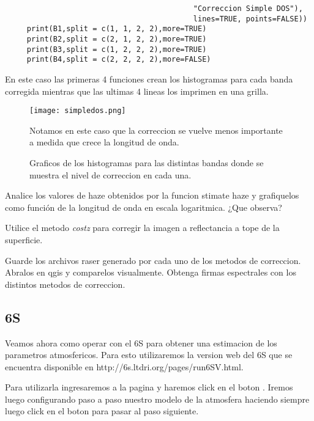 \begin{exa}
\begin{lstlisting}
                                           "Correccion Simple DOS"),
                                           lines=TRUE, points=FALSE))
     print(B1,split = c(1, 1, 2, 2),more=TRUE)
     print(B2,split = c(2, 1, 2, 2),more=TRUE)
     print(B3,split = c(1, 2, 2, 2),more=TRUE)
     print(B4,split = c(2, 2, 2, 2),more=FALSE)
    \end{lstlisting}
    En este caso las primeras 4 funciones crean los histogramas para cada banda
    corregida mientras que las ultimas 4 lineas los imprimen en una grilla.
    \begin{figure}[h!]
    \begin{center}
        \texttt{[image: simpledos.png]}
    \end{center}
    \caption{Graficos de los histogramas para las distintas bandas donde se
        muestra el nivel de correccion en cada una.}
    \label{fig:simpledos.png}
    Notamos en este caso que la correccion se vuelve menos importante a medida
        que crece la longitud de onda.
    \end{figure}

\end{exa}
\begin{act}
    Analice los valores de haze obtenidos por la funcion stimate haze y grafiquelos
    como funci\'on de la longitud de onda en escala logaritmica. ¿Que observa?
\end{act}

\begin{act}
    Utilice el metodo \emph{costz} para corregir la imagen a reflectancia a tope
    de la superficie.
\end{act}

\begin{act}
    Guarde los archivos raser generado por cada uno de los metodos de
    correccion. Abralos en qgis y comparelos visualmente. Obtenga firmas
    espectrales con los distintos metodos de correccion.
\end{act}


\subsection{6S}
\label{sub:corr:6S}

Veamos ahora como operar con el 6S para obtener una estimacion de los parametros
atmosfericos. Para esto utilizaremos la version web del 6S que se encuentra
disponible en http://6s.ltdri.org/pages/run6SV.html.

Para utilizarla ingresaremos a la pagina y haremos click en el boton
. Iremos luego configurando paso a paso nuestro modelo de la
atmosfera haciendo siempre luego click en el boton  para
pasar al paso siguiente.

